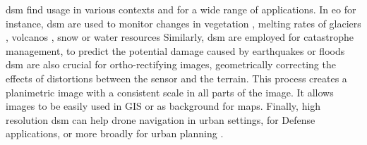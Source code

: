 \acrshort{dsm} find usage in various contexts and for a wide range of applications. In \acrfull{eo} for instance, \acrshort{dsm} are used to monitor changes in vegetation \cite{sadeghi_canopy_2016}, melting rates of glaciers \cite{berthier_glacier_2014, rieg_pleiades_2018}, volcanos \cite{ganci_data_2022}, snow or water resources \cite{marti_mapping_2016, gascoin_theia_2019, yamazaki_merit_2019} \etc{} Similarly, \acrshort{dsm} are employed for catastrophe management, to predict the potential damage caused by earthquakes or floods \cite{jenkins_physics-based_2023} \etc{} \acrshort{dsm} are also crucial for ortho-rectifying images, \ie geometrically correcting the effects of distortions between the sensor and the terrain. This process creates a planimetric image with a consistent scale in all parts of the image. It allows images to be easily used in GIS or as background for maps. Finally, high resolution \acrshort{dsm} can help drone navigation in urban settings, for Defense applications, or more broadly for urban planning \cite{velazco_3d_2012}.

